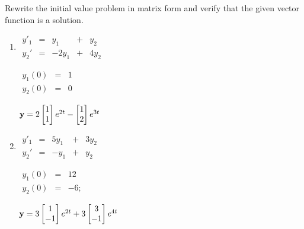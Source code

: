 \documentclass{ximera}
\begin{document}
\begin{problem}\label{exer:10.2.3}
Rewrite the initial value problem in matrix form and
 verify that the given vector function is a solution.

\begin{enumerate}
\item %
 $\begin{array}{ccccc}
 y'_1&=&y_1&+&y_2\\
y_2'&=&-2y_1& +&4y_2\end{array}$

$\begin{array}{ccc}y_1(0)&=&1\\y_2(0)&=&0\end{array}$  

${\bf y}=2\begin{bmatrix}1\\1\end{bmatrix}e^{2t}-\begin{bmatrix}1\\2\end{bmatrix}e^{3t}$

\item %
 $\begin{array}{ccccc}
 y'_1&=&5y_1& +& 3y_2 \\
y_2'&=&- y_1 &+& y_2\end{array}$

$\begin{array}{ccc}y_1(0)&=&12\\y_2(0)&=&-6;\end{array}$ 

${\bf y}=3\begin{bmatrix}1\\-1\end{bmatrix}e^{2t}+3\begin{bmatrix}3\\-1\end{bmatrix}e^{4t}$
\end{enumerate}

\end{problem}
\end{document}

